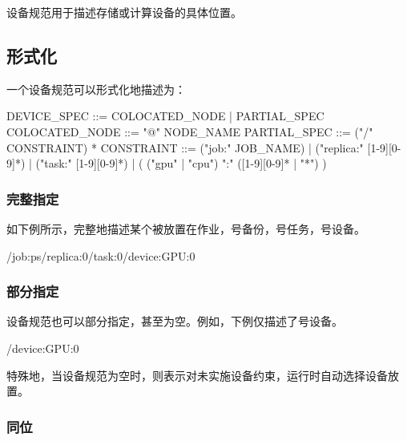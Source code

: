 \begin{content}

设备规范用于描述存储或计算设备的具体位置。

\subsection{形式化}

一个设备规范可以形式化地描述为：

\begin{leftbar}
\begin{python}
DEVICE_SPEC ::= COLOCATED_NODE | PARTIAL_SPEC
COLOCATED_NODE ::= "@" NODE_NAME
PARTIAL_SPEC ::= ("/" CONSTRAINT) *
CONSTRAINT ::= ("job:" JOB_NAME)
             | ("replica:" [1-9][0-9]*)
             | ("task:" [1-9][0-9]*)
             | ( ("gpu" | "cpu") ":" ([1-9][0-9]* | "*") )
\end{python}
\end{leftbar}

\subsubsection{完整指定}

如下例所示，完整地描述某个被放置在作业，号备份，号任务，号设备。

\begin{leftbar}
\begin{python}
/job:ps/replica:0/task:0/device:GPU:0
\end{python}
\end{leftbar}

\subsubsection{部分指定}

设备规范也可以部分指定，甚至为空。例如，下例仅描述了号设备。

\begin{leftbar}
\begin{python}
/device:GPU:0
\end{python}
\end{leftbar}

特殊地，当设备规范为空时，则表示对未实施设备约束，运行时自动选择设备放置。

\subsubsection{同位}


\end{content}
